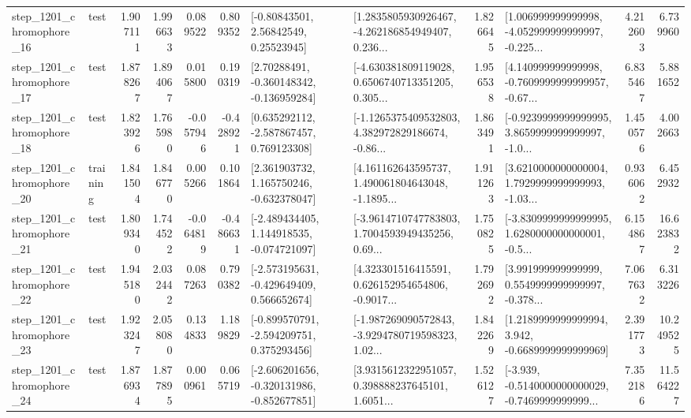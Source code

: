 \begin{tabular}{llrrrrllrlrr}
 step\_1201\_chromophore\_16 &      test &      1.907111 &    1.996633 &      0.089522 &  0.809352 &       [-0.80843501, 2.56842549, 0.25523945] &  [1.2835805930926467, -4.262186854949407, 0.236... &       1.826645 &  [1.006999999999998, -4.052999999999997, -0.225... &            4.212603 &          6.739960 \\
 step\_1201\_chromophore\_17 &      test &      1.878267 &    1.894067 &      0.015800 &  0.190319 &    [2.70288491, -0.360148342, -0.136959284] &  [-4.630381809119028, 0.6506740713351205, 0.305... &       1.956538 &  [4.140999999999998, -0.7609999999999957, -0.67... &            6.835467 &          5.881652 \\
 step\_1201\_chromophore\_18 &      test &      1.823926 &    1.765980 &     -0.057946 & -0.428921 &    [0.635292112, -2.587867457, 0.769123308] &  [-1.1265375409532803, 4.382972829186674, -0.86... &       1.863491 &  [-0.9239999999999995, 3.8659999999999997, -1.0... &            1.450576 &          4.002663 \\
 step\_1201\_chromophore\_20 &  training &      1.841504 &    1.846770 &      0.005266 &  0.101864 &    [2.361903732, 1.165750246, -0.632378047] &  [4.161162643595737, 1.490061804643048, -1.1895... &       1.911263 &  [3.6210000000000004, 1.7929999999999993, -1.03... &            0.936062 &          6.452932 \\
 step\_1201\_chromophore\_21 &      test &      1.809340 &    1.744522 &     -0.064819 & -0.486631 &   [-2.489434405, 1.144918535, -0.074721097] &  [-3.9614710747783803, 1.7004593949435256, 0.69... &       1.750825 &  [-3.8309999999999995, 1.6280000000000001, -0.5... &            6.154867 &         16.623832 \\
 step\_1201\_chromophore\_22 &      test &      1.945180 &    2.032442 &      0.087263 &  0.790382 &   [-2.573195631, -0.429649409, 0.566652674] &  [4.323301516415591, 0.626152954654806, -0.9017... &       1.792692 &  [3.991999999999999, 0.5549999999999997, -0.378... &            7.067632 &          6.313226 \\
 step\_1201\_chromophore\_23 &      test &      1.923247 &    2.058080 &      0.134833 &  1.189829 &   [-0.899570791, -2.594209751, 0.375293456] &  [-1.987269090572843, -3.9294780719598323, 1.02... &       1.842269 &   [1.2189999999999994, 3.942, -0.6689999999999969] &            2.391773 &         10.249525 \\
 step\_1201\_chromophore\_24 &      test &      1.876934 &    1.877895 &      0.000961 &  0.065719 &  [-2.606201656, -0.320131986, -0.852677851] &  [3.9315612322951057, 0.398888237645101, 1.6051... &       1.526127 &  [-3.939, -0.5140000000000029, -0.7469999999999... &            7.352186 &         11.564227 \\

\end{tabular}

